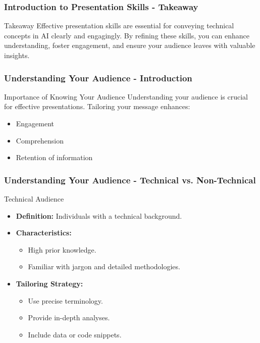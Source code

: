 \documentclass[aspectratio=169]{beamer}
\begin{document}
\begin{frame}[fragile]
    \frametitle{Introduction to Presentation Skills - Takeaway}
    \begin{block}{Takeaway}
        Effective presentation skills are essential for conveying technical concepts in AI clearly and engagingly. By refining these skills, you can enhance understanding, foster engagement, and ensure your audience leaves with valuable insights.
    \end{block}
\end{frame}

\begin{frame}[fragile]
    \frametitle{Understanding Your Audience - Introduction}
    \begin{block}{Importance of Knowing Your Audience}
        Understanding your audience is crucial for effective presentations. 
        Tailoring your message enhances:
        \begin{itemize}
            \item Engagement
            \item Comprehension
            \item Retention of information
        \end{itemize}
    \end{block}
\end{frame}

\begin{frame}[fragile]
    \frametitle{Understanding Your Audience - Technical vs. Non-Technical}
    \begin{block}{Technical Audience}
        \begin{itemize}
            \item \textbf{Definition:} Individuals with a technical background.
            \item \textbf{Characteristics:}
            \begin{itemize}
                \item High prior knowledge.
                \item Familiar with jargon and detailed methodologies.
            \end{itemize}
            \item \textbf{Tailoring Strategy:} 
            \begin{itemize}
                \item Use precise terminology.
                \item Provide in-depth analyses.
                \item Include data or code snippets.
            \end{itemize}
        \end{itemize}
    \end{block}
\end{frame}
\end{document}
